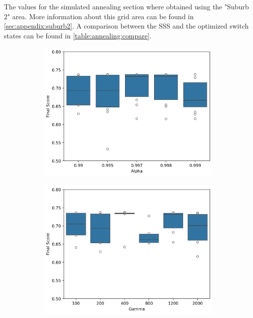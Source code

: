 The values for the simulated annealing section where obtained using
the "Suburb 2" area. More information about this grid area can be
found in  \autoref{sec:appendix:suburb2}. A comparison
between the SSS and the optimized switch states
can be found in \autoref{table:annealing:compare}. 

\begin{figure}[H]
    \begin{subfigure}{.5\textwidth}
      \centering
      \includegraphics[width=\linewidth]{img/switchstate_exploring/suburb2/annealing_sampling/alhpa.png}
      \caption{}
    \end{subfigure}%
    \begin{subfigure}{.5\textwidth}
      \centering
      \includegraphics[width=\linewidth]{img/switchstate_exploring/suburb2/annealing_sampling/beta.png}

\end{subfigure}
\end{figure}
